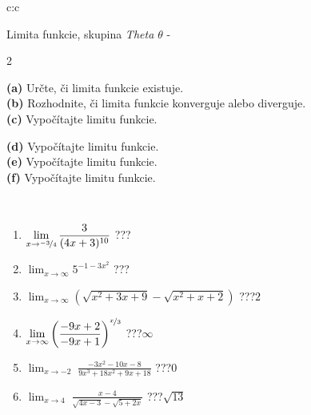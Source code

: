 \documentclass[10pt]{report}
\begin{document}
\begin{tabular}{c:c}
\begin{minipage}[c][104.5mm][t]{0.5\linewidth}
\begin{center}
\vspace{7mm}
{\huge Limita funkcie, skupina \textit{Theta $\theta$} -}\\[5mm]
\begin{minipage}{0.95\linewidth}
\begin{center}
{\small \begin{multicols}{2} \raggedright
\textbf{(a)} Určte, či limita funkcie existuje. \\[1mm]
\textbf{(b)} Rozhodnite, či limita funkcie konverguje alebo diverguje. \\[1mm]
\textbf{(c)} Vypočítajte limitu funkcie. \par \columnbreak
\textbf{(d)} Vypočítajte limitu funkcie. \\[1mm]
\textbf{(e)} Vypočítajte limitu funkcie. \\[1mm]
\textbf{(f)} Vypočítajte limitu funkcie. \\[1mm]
\end{multicols}
}
\end{center}
\end{minipage}
\\[4mm]
\begin{minipage}{0.79\linewidth}
\begin{center}
\begin{varwidth}{\linewidth}
\begin{enumerate}
\normalsize
\item $\displaystyle\lim_{x\to\nicefrac{-3}{4}}{\frac{3}{(4x+3)^{10}}}$\quad \dotfill\; ???\;\dotfill \quad {}
\item $\displaystyle\lim_{x\to\infty}{5^{-1-3x^2}}$\quad \dotfill\; ???\;\dotfill \quad {}
\item $\displaystyle\lim_{x\to\infty}{\left(\sqrt{x^2+3x+9} - \sqrt{x^2+x+2}\right)}$\quad \dotfill\; ???\;\dotfill \quad $2$
\item $\displaystyle\lim_{x\to\infty}{\left( \frac{-9x+2}{-9x+1} \right)^{\nicefrac{x}{3}}}$\quad \dotfill\; ???\;\dotfill \quad $\infty$
\item $\displaystyle\lim_{x\to -2}{\;\frac{-3x^2-10x-8}{9x^3+18x^2+9x+18}}$\quad \dotfill\; ???\;\dotfill \quad $0$
\item $\displaystyle\lim_{x\to 4}{\;\frac{x-4}{\sqrt{4x-3} - \sqrt{5+2x}}}$\quad \dotfill\; ???\;\dotfill \quad $\sqrt{13}$

\end{enumerate}
\end{varwidth}
\end{center}
\end{minipage}
\end{center}
\end{minipage}
\end{tabular}
\end{document}
